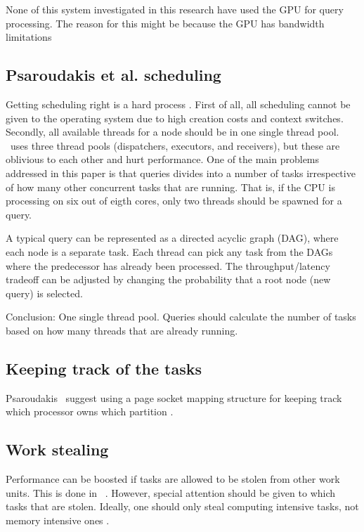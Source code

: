 None of this system investigated in this research have used the GPU for query processing. The reason for this might be because the GPU has bandwidth limitations \cite{Willhalm2009-hu}

\subsection{Psaroudakis et al. scheduling}
\label{sub:Psaroudakis scheduling}
Getting scheduling right is a hard process \cite{Psaroudakis2013-fn}. First of all, all scheduling cannot be given to the operating system due to high creation costs and context switches. Secondly, all available threads for a node should be in one single thread pool. \oracle~uses three thread pools (dispatchers, executors, and receivers), but these are oblivious to each other and hurt performance. One of the main problems addressed in this paper is that queries divides into a number of tasks irrespective of how many other concurrent tasks that are running. That is, if the CPU is processing on six out of eigth cores, only two threads should be spawned for a query.

A typical query can be represented as a directed acyclic graph (DAG), where each node is a separate task. Each thread can pick any task from the DAGs where the predecessor has already been processed. The throughput/latency tradeoff can be adjusted by changing the probability that a root node (new query) is selected.

Conclusion: One single thread pool. Queries should calculate the number of tasks based on how many threads that are already running.
\subsection{Keeping track of the tasks}
\label{sub:Keeping track of the tasks}
Psaroudakis \ea~suggest using a page socket mapping structure for keeping track which processor owns which partition \cite{Psaroudakis2015-lc}.


\subsection{Work stealing}
\label{sub:Work stealing}
Performance can be boosted if tasks are allowed to be stolen from other work units. This is done in \blink~\cite{Barber2012-xt}. However, special attention should be given to which tasks that are stolen. Ideally, one should only steal computing intensive tasks, not memory intensive ones \cite{Psaroudakis2015-lc}.


